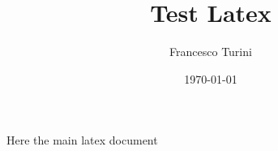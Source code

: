 \documentclass{article}
\title{Test Latex}
\author{Francesco Turini}
\date{\today}
\begin{document}
\maketitle
Here the main latex document
\end{document}
